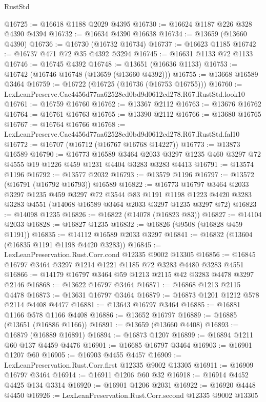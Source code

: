 \begin{lexlean}{RustStd}
\begin{coremodule}
@16725 := @16618 @1188 @2029 @4395
@16730 := @16624 @1187 @226 @328 @4390 @4394
@16732 := @16634 @4390 @16638
@16734 := @13659 (@13660 @4390)
@16736 := @16730 (@16732 @16734)
@16737 := @16623 @1185
@16742 := @16737 @471 @72 @35 @4392 @3294
@16745 := @16631 @1133 @72 @1133
@16746 := @16745 @4392
@16748 := @13651 (@16636 @1133)
@16753 := @16742 (@16746 @16748 (@13659 (@13660 @4392)))
@16755 := @13668 @16589 @3464
@16759 := @16722 (@16725 (@16736 (@16753 @16755)))
@16760 := LexLeanPreserve.Cae4456d77aa62528ed0bd9d0612cd278.R67.RustStd.look10
@16761 := @16759 @16760
@16762 := @13367 @2112
@16763 := @13676 @16762
@16764 := @16761 @16763
@16765 := @13390 @2112
@16766 := @13680 @16765
@16767 := @16764 @16766
@16768 := LexLeanPreserve.Cae4456d77aa62528ed0bd9d0612cd278.R67.RustStd.fal10
@16772 := @16707 (@16712 (@16767 @16768 @14227))
@16773 := @13873 @16589
@16790 := @16773
    @16589
    @3464
    @2033
    @3297
    @1235
    @460
    @3297
    @72
    @4555
    @19
    @1226
    @459
    @1231
    @4404
    @3283
    @3283
    @4413
@16791 := @13574 @1196
@16792 := @13577 @2032
@16793 := @13579 @1196
@16797 := @13572 (@16791 (@16792 @16793)) @16589
@16822 := @16773
    @16797
    @3464
    @2033
    @3297
    @1235
    @459
    @3297
    @72
    @3544
    @83
    @1191
    @1198
    @1223
    @4420
    @3283
    @3283
    @4551
    (@14068 @16589 @3464 @2033 @3297 @1235 @3297 @72)
@16823 := @14098 @1235
@16826 := @16822 (@14078 (@16823 @83))
@16827 := @14104 @2033
@16828 := @16827 @1235
@16832 := @16826 (@9508 (@16828 @459 @1191))
@16835 := @14112 @16589 @2033 @3297
@16841 := @16832 (@13604 (@16835 @1191 @1198 @4420 @3283))
@16845 := LexLeanPreservation.Rust.Corr.cond @12335 @9002 @13305
@16856 := @16845 @16797 @3464 @3297 @1214 @1221 @1185 @72 @3283 @4480 @3283 @4551
@16866 := @14179 @16797 @3464 @59 @1213 @2115 @42 @3283 @4478 @3297 @2146
@16868 := @13622 @16797 @3464
@16871 := @16868 @1213 @2115 @4478
@16873 := @13631 @16797 @3464
@16879 := @16873 @1201 @1212 @578 @2114 @4408 @4477
@16881 := @13643 @16797 @3464
@16885 := @16881 @1166 @578 @1166 @4408
@16886 := @13652 @16797
@16889 := @16885 (@13651 (@16886 @1166))
@16891 := @13659 (@13660 @4408)
@16893 := @16879 (@16889 @16891)
@16894 := @16873 @1207
@16899 := @16894 @1211 @60 @137 @4459 @4476
@16901 := @16685 @16797 @3464
@16903 := @16901 @1207 @60
@16905 := @16903 @4455 @4457
@16909 := LexLeanPreservation.Rust.Corr.first @12335 @9002 @13305
@16911 := @16909 @16797 @3464
@16914 := @16911 @1206 @60 @32
@16918 := @16914 @4452 @4425 @134 @3314
@16920 := @16901 @1206 @2031
@16922 := @16920 @4448 @4450
@16926 := LexLeanPreservation.Rust.Corr.second @12335 @9002 @13305

\end{coremodule}
\end{lexlean}
